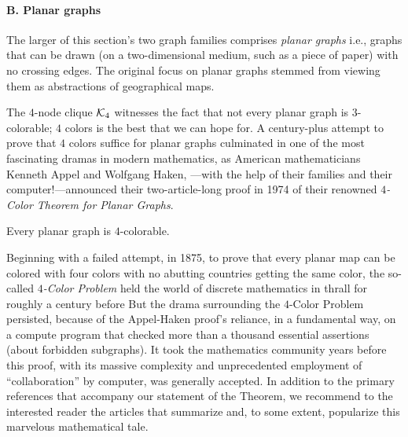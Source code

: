 \paragraph{\small\sf B. Planar graphs}

The larger of this section's two graph families comprises {\it planar
  graphs}   i.e., graphs
that can be drawn (on a two-dimensional medium, such as a piece of
paper) with no crossing edges.  The original focus on planar graphs
stemmed from viewing them as abstractions of geographical maps.

The $4$-node clique $\mbox{$\cal K$}_4$ witnesses the fact that not every planar
graph is $3$-colorable; $4$ colors is the best that we can hope for.
A century-plus attempt to prove that $4$ colors suffice for planar
graphs culminated in one of the most fascinating dramas in modern
mathematics, as American mathematicians Kenneth Appel 
and Wolfgang Haken, ---with the help of their
families and their computer!---announced their two-article-long proof
in 1974 of their renowned {\it $4$-Color Theorem for Planar Graphs}.

\begin{theorem}
\label{thm:Four-ColorTheorem}
Every planar graph is $4$-colorable.
\end{theorem}

Beginning with a failed attempt, in 1875, to prove that every planar
map can be colored with four colors with no abutting countries getting
the same color, the so-called {\it $4$-Color Problem}  held the world of discrete
mathematics in thrall for roughly a century before But the drama
surrounding the $4$-Color Problem persisted, because of the
Appel-Haken proof's reliance, in a fundamental way, on a compute
program that checked more than a thousand essential assertions (about
forbidden subgraphs).  It took the mathematics community years before
this proof, with its massive complexity and unprecedented employment
of ``collaboration'' by computer, was generally accepted.  In addition
to the primary references \cite{AppelH77a,AppelH77b} that accompany
our statement of the Theorem, we recommend to the interested reader
the articles \cite{AppelH77c,AppelH89} that summarize and, to some
extent, popularize this marvelous mathematical tale.

